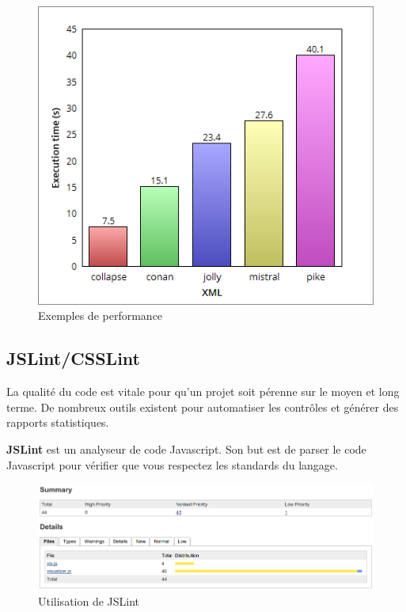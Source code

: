 \documentclass [a4paper,11pt]{article}
\begin{document}
\begin{figure}[H]
\centering
\includegraphics[scale=0.4]{img/benchmark.png}
\caption {Exemples de performance}
\end{figure}

\subsection{JSLint/CSSLint}

La qualité du code est vitale pour qu'un projet soit pérenne sur le moyen et long terme. De nombreux outils existent pour automatiser les contrôles et générer des rapports statistiques.\newline

\textbf{JSLint} est un analyseur de code Javascript. Son but est de parser le code Javascript pour vérifier que vous respectez les standards du langage.\newline

\begin{figure}[H]
\centering
\includegraphics[scale=0.4]{img/checkstyle.png}
\caption {Utilisation de JSLint}
\end{figure}
\end{document}
